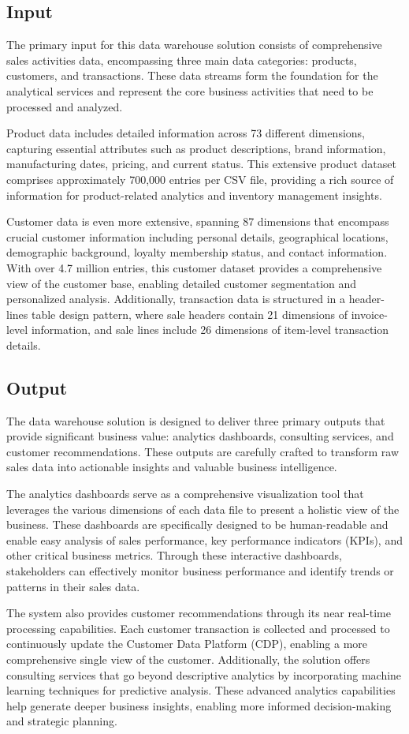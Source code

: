 \subsection{Input}
The primary input for this data warehouse solution consists of comprehensive sales activities data,
encompassing three main data categories: products, customers, and transactions. These data streams
form the foundation for the analytical services and represent the core business activities that need
to be processed and analyzed.

Product data includes detailed information across 73 different dimensions, capturing essential
attributes such as product descriptions, brand information, manufacturing dates, pricing, and
current status. This extensive product dataset comprises approximately 700,000 entries per CSV file,
providing a rich source of information for product-related analytics and inventory management
insights.

Customer data is even more extensive, spanning 87 dimensions that encompass crucial customer
information including personal details, geographical locations, demographic background, loyalty
membership status, and contact information. With over 4.7 million entries, this customer dataset
provides a comprehensive view of the customer base, enabling detailed customer segmentation and
personalized analysis. Additionally, transaction data is structured in a header-lines table design
pattern, where sale headers contain 21 dimensions of invoice-level information, and sale lines
include 26 dimensions of item-level transaction details.

\subsection{Output}
The data warehouse solution is designed to deliver three primary outputs that provide significant
business value: analytics dashboards, consulting services, and customer recommendations. These
outputs are carefully crafted to transform raw sales data into actionable insights and valuable
business intelligence.

The analytics dashboards serve as a comprehensive visualization tool that leverages the various
dimensions of each data file to present a holistic view of the business. These dashboards are
specifically designed to be human-readable and enable easy analysis of sales performance, key
performance indicators (KPIs), and other critical business metrics. Through these interactive
dashboards, stakeholders can effectively monitor business performance and identify trends or
patterns in their sales data.

The system also provides customer recommendations through its near real-time processing
capabilities. Each customer transaction is collected and processed to continuously update the
Customer Data Platform (CDP), enabling a more comprehensive single view of the customer.
Additionally, the solution offers consulting services that go beyond descriptive analytics by
incorporating machine learning techniques for predictive analysis. These advanced analytics
capabilities help generate deeper business insights, enabling more informed decision-making and
strategic planning.